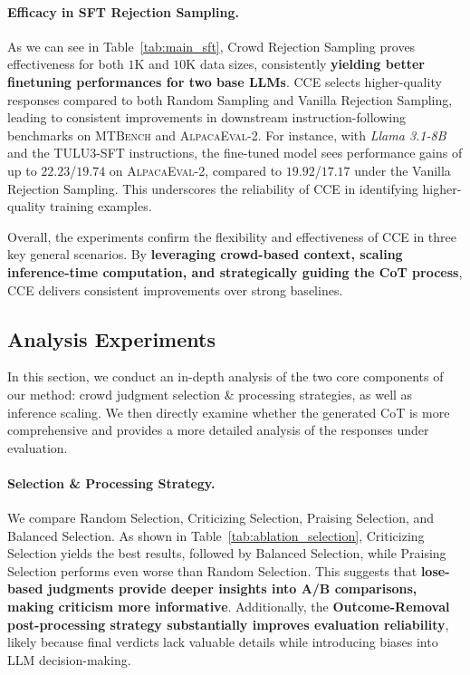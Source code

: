 \paragraph{Efficacy in SFT Rejection Sampling.} As we can see in Table~\ref{tab:main_sft}, Crowd Rejection Sampling proves effectiveness for both $1$K and $10$K data sizes, consistently \textbf{yielding better finetuning performances for two base LLMs}. \textsc{CCE} selects higher-quality responses compared to both Random Sampling and Vanilla Rejection Sampling, leading to consistent improvements in downstream instruction-following benchmarks on \textsc{MTBench} and \textsc{AlpacaEval-2}. For instance, with \textit{Llama 3.1-8B} and the TULU3-SFT instructions, the fine-tuned model sees performance gains of up to $22.23$/$19.74$ on \textsc{AlpacaEval-2}, compared to $19.92$/$17.17$ under the Vanilla Rejection Sampling. This underscores the reliability of \textsc{CCE} in identifying higher-quality training examples.

Overall, the experiments confirm the flexibility and effectiveness of \textsc{CCE} in three key general scenarios. By \textbf{leveraging crowd-based context, scaling inference-time computation, and strategically guiding the CoT process}, \textsc{CCE} delivers consistent improvements over strong baselines.


\subsection{Analysis Experiments}
In this section, we conduct an in-depth analysis of the two core components of our method: crowd judgment selection \& processing strategies, as well as inference scaling. We then directly examine whether the generated CoT is more comprehensive and provides a more detailed analysis of the responses under evaluation.


\paragraph{Selection \& Processing Strategy.}
We compare Random Selection, Criticizing Selection, Praising Selection, and Balanced Selection.
As shown in Table~\ref{tab:ablation_selection}, Criticizing Selection yields the best results, followed by Balanced Selection, while Praising Selection performs even worse than Random Selection. This suggests that \textbf{lose-based judgments provide deeper insights into A/B comparisons, making criticism more informative}. Additionally, the \textbf{Outcome-Removal post-processing strategy substantially improves evaluation reliability}, likely because final verdicts lack valuable details while introducing biases into LLM decision-making.




